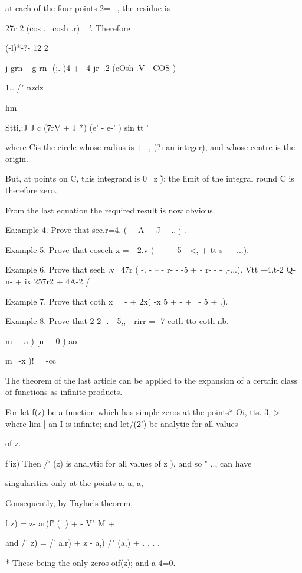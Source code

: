 at each of the four points 2= ~, the residue is

 27r 2 (cos . \ cosh .r) ~ '. Therefore

  (-l)*-?- 12 2

 j grn- \ g-rn- (;. )4 + \ 4 jr\ .2 (cOsh .V - COS )

1,. /" nzdz

hm

Stti,;J J c (7rV + J *) (e' - e-' ) sin tt '

where Cis the circle whose radius is + -, (?i an integer), and whose
centre is the origin.

But, at points on C, this integrand is 0 \ z \~ ); the limit of the
integral round C is therefore zero.

From the last equation the required result is now obvious.

Ea:ample 4. Prove that sec.r=4. ( - -A + J- - .. j .

Example 5. Prove that cosech x = - 2.v ( - - - --5 - <, + tt-s - -
...).

Example 6. Prove that seeh .v=47r ( -. - -- - r- - -5 + - r- - -
,-...). Vtt +4.t-2 Q-n- + ix 257r2 + 4A-2 /

Example 7. Prove that coth x = - + 2x( -x 5 + - + \ - 5 + .).

Example 8. Prove that 2 2 -. - 5,, - rirr = -7 coth tto coth nb.

 m + a ) [n + 0 ) ao

m=-x )! = -cc


The theorem of the last article can be applied to the expansion of a
certain class of functions as infinite products.

For let f(z) be a function which has simple zeros at the points* Oi,
tts. 3, > where lim | an I is infinite; and let/(2') be analytic
for all values

of z.

f'iz) Then /' (z) is analytic for all values of z ), and so "
,., can have

singularities only at the points a, a, a, -

Consequently, by Taylor's theorem,

f z) = z- ar)f' ( .) + - V" M +   

and /' z) = /' a.r) + z - a,) /" (a,) + . . . .

* These being the only zeros oif(z); and a 4=0.

